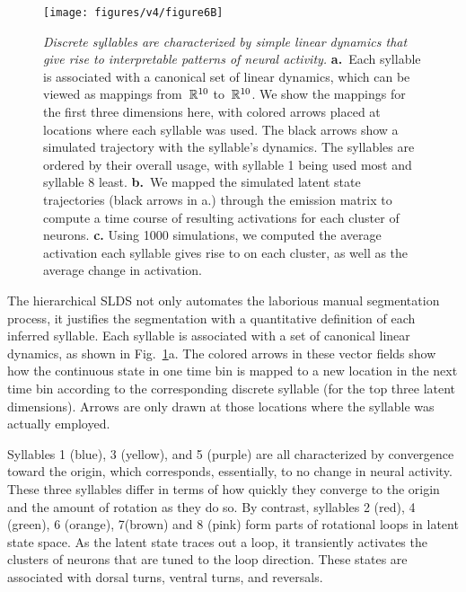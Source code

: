 \documentclass[11pt]{article}
\begin{document}
\begin{figure}[t!]
  \centering
  \vspace{-.5in}
  \texttt{[image: figures/v4/figure6B]}
  \caption{\textit{Discrete syllables are characterized by simple
      linear dynamics that give rise to interpretable patterns of
      neural activity.}  \textbf{a.}~Each syllable is associated with
    a canonical set of linear dynamics, which can be viewed as
    mappings from~$\mathbb{R}^{10}$ to~$\mathbb{R}^{10}$.  We show the
    mappings for the first three dimensions here, with colored arrows
    placed at locations where each syllable was used.  The black
    arrows show a simulated trajectory with the syllable's
    dynamics. The syllables are ordered by their overall usage, with
    syllable 1 being used most and syllable 8 least. \textbf{b.}~We
    mapped the simulated latent state trajectories (black arrows in
    a.) through the emission matrix to compute a time course of
    resulting activations for each cluster of neurons.  \textbf{c.}
    Using 1000 simulations, we computed the average activation each
    syllable gives rise to on each cluster, as well as the average
    change in activation.  }
  \label{fig:dynamics}
\end{figure}

The hierarchical SLDS not only automates the laborious manual
segmentation process, it justifies the segmentation with a
quantitative definition of each inferred syllable. Each syllable is
associated with a set of canonical linear dynamics, as shown in
Fig.~\ref{fig:dynamics}a. The colored arrows in these vector fields
show how the continuous state in one time bin is mapped to a new
location in the next time bin according to the corresponding discrete
syllable (for the top three latent dimensions).  Arrows are only drawn
at those locations where the syllable was actually employed.

Syllables 1 (blue), 3 (yellow), and 5 (purple) are all characterized
by convergence toward the origin, which corresponds, essentially, to
no change in neural activity. These three syllables differ in terms of how
quickly they converge to the origin and the amount of rotation as
they do so.  By contrast, syllables 2 (red), 4 (green), 6 (orange), 7(brown)
and 8 (pink) form parts of rotational loops in latent state space.
As the latent state traces out a loop, it transiently activates
the clusters of neurons that are tuned to the loop direction.
These states are associated with dorsal turns, ventral turns, and
reversals.  
\end{document}
